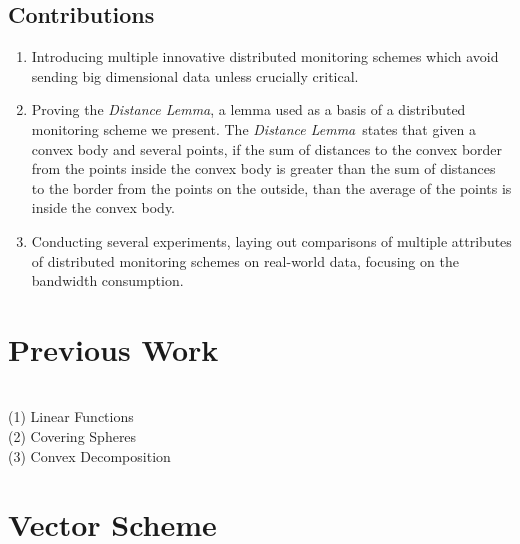 \documentclass[10pt, conference]{IEEEtran}
\newcommand{\distanceLemma}{\textit{Distance Lemma}}
\begin{document}
\subsection{Contributions}
\begin{enumerate}
\item Introducing multiple innovative distributed monitoring schemes which avoid sending big dimensional data unless crucially critical.
\item Proving the \distanceLemma , a lemma used as a basis of a distributed monitoring scheme we present. The \distanceLemma \ states that given a convex body and several points, if the sum of distances to the convex border from the points inside the convex body is greater than the sum of distances to the border from the points on the outside, than the average of the points is inside the convex body.
\item Conducting several experiments, laying out comparisons of multiple attributes of distributed monitoring schemes on real-world data, focusing on the bandwidth consumption.
\end{enumerate}

\section{Previous Work}
 \ \ \  \\
(1) Linear Functions \\
(2) Covering Spheres \\
(3) Convex Decomposition
\section{Vector Scheme}
\end{document}
